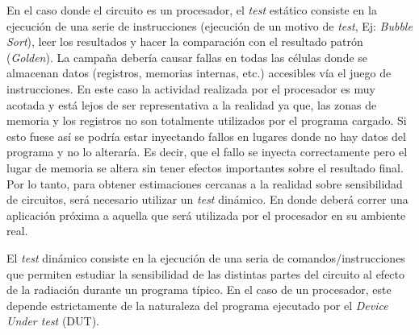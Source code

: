\documentclass[a4paper,openright,12pt]{report}
\begin{document}
En el caso donde el circuito es un procesador, el \textit{test} estático consiste en la ejecución de una serie de instrucciones (ejecución  de un motivo de \textit{test}, Ej: \textit{Bubble Sort}), leer los resultados y hacer la comparación con el resultado patrón (\textit{Golden}). La campaña debería causar fallas en todas las células donde se almacenan datos (registros,  memorias internas, etc.) accesibles vía el juego de instrucciones. 
En este caso la actividad realizada por el procesador es muy acotada y está lejos de ser representativa a la realidad ya que, las zonas de memoria y los registros  no son totalmente utilizados por el programa cargado. Si esto fuese así se podría estar inyectando fallos en lugares donde no hay datos del programa y no lo alteraría. Es decir, que el fallo se inyecta correctamente pero el lugar de memoria se altera sin tener efectos importantes sobre el resultado final.
Por lo tanto, para obtener estimaciones cercanas a la realidad sobre sensibilidad de circuitos, será necesario utilizar un \textit{test} dinámico. En donde deberá correr una aplicación próxima a aquella que será  utilizada por el procesador  en su ambiente real.
%
%
%
%
%

El \textit{test} dinámico consiste en la ejecución de una seria de  comandos/instrucciones que permiten estudiar la sensibilidad de las distintas partes del circuito al efecto de la radiación durante un programa típico. En el caso de un procesador, este depende estrictamente de la naturaleza del programa ejecutado por el \textit{Device Under \textit{test}} (DUT).
\end{document}
